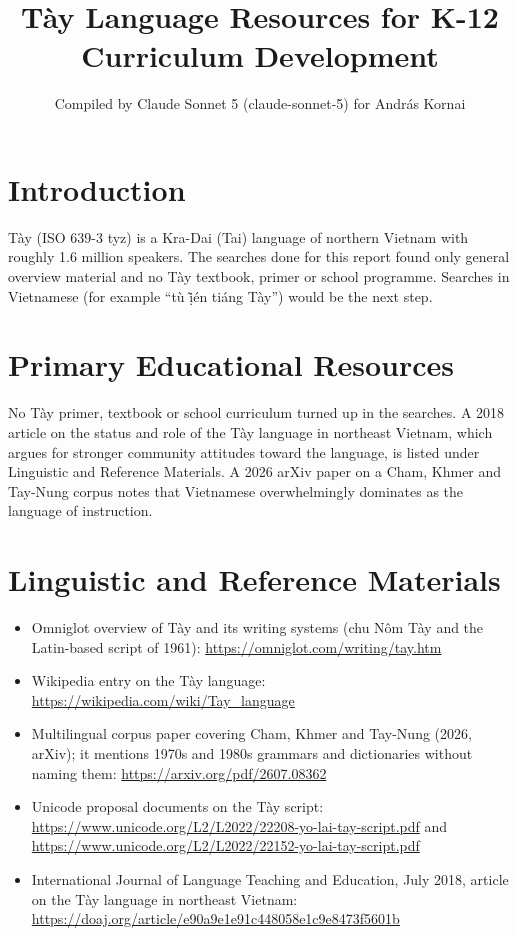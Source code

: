 \documentclass[12pt]{article}
\title{T\`ay Language Resources for K-12 Curriculum Development}
\author{Compiled by Claude Sonnet 5 (claude-sonnet-5) for Andr\'as Kornai}
\date{}
\begin{document}
\maketitle

\section{Introduction}
T\`ay (ISO 639-3 tyz) is a Kra-Dai (Tai) language of northern Vietnam with roughly 1.6 million speakers. The searches done for this report found only general overview material and no T\`ay textbook, primer or school programme. Searches in Vietnamese (for example ``t\`u \d{\~i}\'en ti\'ang T\`ay'') would be the next step.

\section{Primary Educational Resources}
No T\`ay primer, textbook or school curriculum turned up in the searches. A 2018 article on the status and role of the T\`ay language in northeast Vietnam, which argues for stronger community attitudes toward the language, is listed under Linguistic and Reference Materials. A 2026 arXiv paper on a Cham, Khmer and Tay-Nung corpus notes that Vietnamese overwhelmingly dominates as the language of instruction.

\section{Linguistic and Reference Materials}
\begin{itemize}
\item Omniglot overview of T\`ay and its writing systems (chu N\^om T\`ay and the Latin-based script of 1961): \url{https://omniglot.com/writing/tay.htm}
\item Wikipedia entry on the T\`ay language: \url{https://wikipedia.com/wiki/Tay_language}
\item Multilingual corpus paper covering Cham, Khmer and Tay-Nung (2026, arXiv); it mentions 1970s and 1980s grammars and dictionaries without naming them: \url{https://arxiv.org/pdf/2607.08362}
\item Unicode proposal documents on the T\`ay script: \url{https://www.unicode.org/L2/L2022/22208-yo-lai-tay-script.pdf} and \url{https://www.unicode.org/L2/L2022/22152-yo-lai-tay-script.pdf}
\item International Journal of Language Teaching and Education, July 2018, article on the T\`ay language in northeast Vietnam: \url{https://doaj.org/article/e90a9e1e91c448058e1c9e8473f5601b}
\end{itemize}
\end{document}
